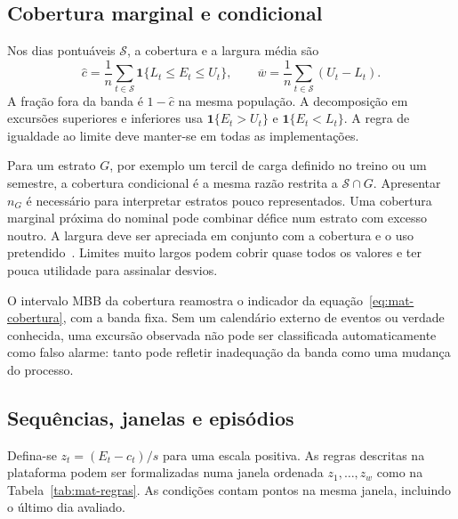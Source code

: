 \subsection{Cobertura marginal e condicional}
\label{sec:mat-cobertura}
Nos dias pontuáveis $\mathcal S$, a cobertura e a largura média são
\begin{equation}
\widehat c=\frac1n\sum_{t\in\mathcal S}\mathbf1\{L_t\leq E_t\leq U_t\},
\qquad \overline w=\frac1n\sum_{t\in\mathcal S}(U_t-L_t).
\label{eq:mat-cobertura}
\end{equation}
A fração fora da banda é $1-\widehat c$ na mesma população. A decomposição em excursões superiores e inferiores usa $\mathbf1\{E_t>U_t\}$ e $\mathbf1\{E_t<L_t\}$. A regra de igualdade ao limite deve manter-se em todas as implementações.

Para um estrato $G$, por exemplo um tercil de carga definido no treino ou um semestre, a cobertura condicional é a mesma razão restrita a $\mathcal S\cap G$. Apresentar $n_G$ é necessário para interpretar estratos pouco representados. Uma cobertura marginal próxima do nominal pode combinar défice num estrato com excesso noutro. A largura deve ser apreciada em conjunto com a cobertura e o uso pretendido~\parencite{Gneiting2007}. Limites muito largos podem cobrir quase todos os valores e ter pouca utilidade para assinalar desvios.

O intervalo MBB da cobertura reamostra o indicador da equação~\ref{eq:mat-cobertura}, com a banda fixa. Sem um calendário externo de eventos ou verdade conhecida, uma excursão observada não pode ser classificada automaticamente como falso alarme: tanto pode refletir inadequação da banda como uma mudança do processo.

\subsection{Sequências, janelas e episódios}
\label{sec:mat-regras}
Defina-se $z_t=(E_t-c_t)/s$ para uma escala positiva. As regras descritas na plataforma podem ser formalizadas numa janela ordenada $z_1,\ldots,z_w$ como na Tabela~\ref{tab:mat-regras}. As condições contam pontos na mesma janela, incluindo o último dia avaliado.

